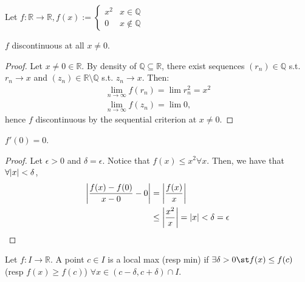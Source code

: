 \begin{example}
    Let $f: \mathbb{R} \to \mathbb{R}, f(x) := \begin{cases}
        x^2 & x \in \mathbb{Q}\\
        0 & x \notin \mathbb{Q}
    \end{cases}$

    \noindent{} $f$ discontinuous at all $x \neq 0$.

    \begin{proof}
        Let $x \neq 0 \in \mathbb{R}$. By density of $\mathbb{Q} \subseteq \mathbb{R}$, there exist sequences $(r_n) \in \mathbb{Q}$ s.t. $r_n \to x$ and $(z_n) \in \mathbb{R} \setminus \mathbb{Q}$ s.t. $z_n \to x$. Then:\begin{align*}
            \lim_{n \to \infty} f(r_n) = \lim r_n^2 = x^2\\
            \lim_{n \to \infty} f(z_n) = \lim 0,
        \end{align*}
        hence $f$ discontinuous by the sequential criterion at $x \neq 0$.
    \end{proof}
    
    \noindent{} $f'(0) = 0$. 
    \begin{proof}
        Let $\epsilon > 0$ and $\delta = \epsilon$. Notice that $f(x) \leq x^2 \forall x$. Then, we have that $\forall \abs{x} < \delta$, \begin{align*}
            \abs{\frac{f(x) - f(0)}{x-0} - 0} &= \abs{\frac{f(x)}{x}} \\
            &\leq \abs{\frac{x^2}{x}} = \abs{x} < \delta = \epsilon 
        \end{align*}
    \end{proof}
\end{example}

\begin{definition}
    Let $f: I \to \mathbb{R}$. A point $c \in I$ is a local max (resp min) if $\exists \delta > 0 \st f(x) \leq f(c)$ (resp $f(x) \geq f(c)$) $\forall x \in (c - \delta, c + \delta) \cap I$.
\end{definition}

